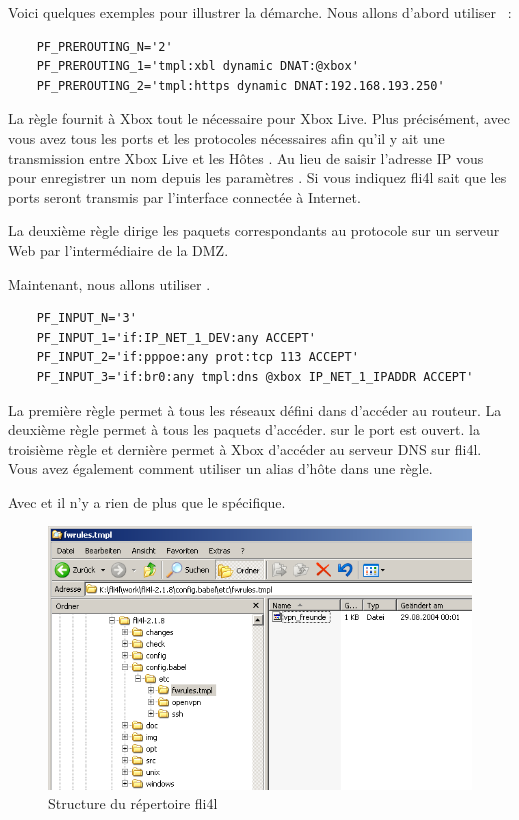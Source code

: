 Voici quelques exemples pour illustrer la démarche. Nous allons d'abord
utiliser ~:

\begin{example}
\begin{verbatim}
    PF_PREROUTING_N='2'
    PF_PREROUTING_1='tmpl:xbl dynamic DNAT:@xbox'
    PF_PREROUTING_2='tmpl:https dynamic DNAT:192.168.193.250'
\end{verbatim}
\end{example}

La règle  fournit à Xbox tout le nécessaire pour Xbox
Live. Plus précisément, avec  vous avez tous les ports et les
protocoles nécessaires afin qu'il y ait une transmission entre Xbox Live et les
Hôtes . Au lieu de saisir l'adresse IP vous pour enregistrer un
nom depuis les paramètres . Si vous indiquez 
fli4l sait que les ports seront transmis par l'interface connectée à Internet.

La deuxième règle dirige les paquets correspondants au protocole
 sur un serveur Web par l'intermédiaire de la DMZ.

Maintenant, nous allons utiliser .

\begin{example}
\begin{verbatim}
    PF_INPUT_N='3'
    PF_INPUT_1='if:IP_NET_1_DEV:any ACCEPT'
    PF_INPUT_2='if:pppoe:any prot:tcp 113 ACCEPT'
    PF_INPUT_3='if:br0:any tmpl:dns @xbox IP_NET_1_IPADDR ACCEPT'
\end{verbatim}
\end{example}

La première règle permet à tous les réseaux défini dans 
d'accéder au routeur. La deuxième règle permet à tous les paquets
 d'accéder. sur le port  est ouvert. la
troisième règle et dernière permet à Xbox d'accéder au serveur DNS
sur fli4l. Vous avez également comment utiliser un alias d'hôte dans une
règle.

Avec  et  il n'y a rien de plus que le
  spécifique.

\begin{figure}[htbp]
  \centering
  \includegraphics[width=0.9\columnwidth]{etc_fwrules_tmpl_dir}
  \caption{Structure du répertoire fli4l}
  \label{fig:etc_fwrules_tmpl_dir}
\end{figure}

